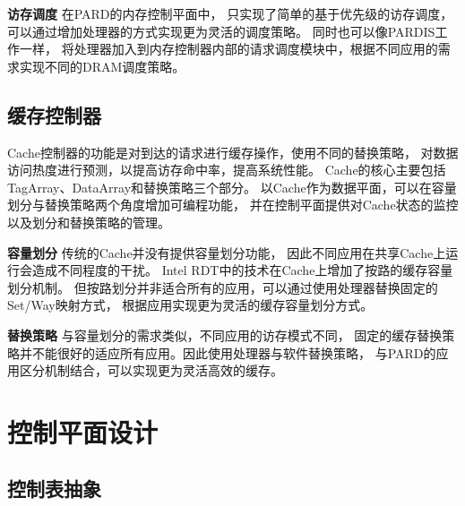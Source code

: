 \textbf{访存调度}\quad
在PARD的内存控制平面中，
只实现了简单的基于优先级的访存调度，可以通过增加处理器的方式实现更为灵活的调度策略。
同时也可以像PARDIS\cite{bojnordi_pardis:_2012}工作一样，
将处理器加入到内存控制器内部的请求调度模块中，根据不同应用的需求实现不同的DRAM调度策略。

\subsection{缓存控制器}
Cache控制器的功能是对到达的请求进行缓存操作，使用不同的替换策略，
对数据访问热度进行预测，以提高访存命中率，提高系统性能。
Cache的核心主要包括TagArray、DataArray和替换策略三个部分。
以Cache作为数据平面，可以在容量划分与替换策略两个角度增加可编程功能，
并在控制平面提供对Cache状态的监控以及划分和替换策略的管理。

\textbf{容量划分}\quad
传统的Cache并没有提供容量划分功能，
因此不同应用在共享Cache上运行会造成不同程度的干扰。
Intel RDT中的技术\cite{intel-cat}在Cache上增加了按路的缓存容量划分机制。
但按路划分并非适合所有的应用，可以通过使用处理器替换固定的Set/Way映射方式，
根据应用实现更为灵活的缓存容量划分方式。

\textbf{替换策略}\quad
与容量划分的需求类似，不同应用的访存模式不同，
固定的缓存替换策略并不能很好的适应所有应用。因此使用处理器与软件替换策略，
与PARD的应用区分机制结合，可以实现更为灵活高效的缓存。

\section{控制平面设计}
\label{chap:hwresman:cp}


%
%

\subsection{控制表抽象}
\label{chap:hwresman:cp:table}

